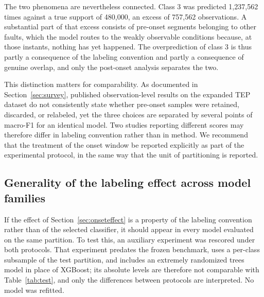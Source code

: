 \documentclass[12pt,a4paper]{article}
\begin{document}
The two phenomena are nevertheless connected. Class 3 was predicted 1,237,562
times against a true support of 480,000, an excess of 757,562 observations. A
substantial part of that excess consists of pre-onset segments belonging to
other faults, which the model routes to the weakly observable conditions
because, at those instants, nothing has yet happened. The overprediction of
class 3 is thus partly a consequence of the labeling convention and partly a
consequence of genuine overlap, and only the post-onset analysis separates the
two.

This distinction matters for comparability. As documented in
Section~\ref{sec:survey}, published observation-level results on the expanded
TEP dataset do not consistently state whether pre-onset samples were retained,
discarded, or relabeled, yet the three choices are separated by several points
of macro-F1 for an identical model. Two studies reporting different scores may
therefore differ in labeling convention rather than in method. We recommend
that the treatment of the onset window be reported explicitly as part of the
experimental protocol, in the same way that the unit of partitioning is
reported.

\subsection{Generality of the labeling effect across model families}
\label{sec:generality}

If the effect of Section~\ref{sec:onseteffect} is a property of the labeling
convention rather than of the selected classifier, it should appear in every
model evaluated on the same partition. To test this, an auxiliary experiment
was rescored under both protocols. That experiment predates the frozen
benchmark, uses a per-class subsample of the test partition, and includes an
extremely randomized trees model in place of XGBoost; its absolute levels are
therefore not comparable with Table~\ref{tab:test}, and only the differences
between protocols are interpreted. No model was refitted.
\end{document}
